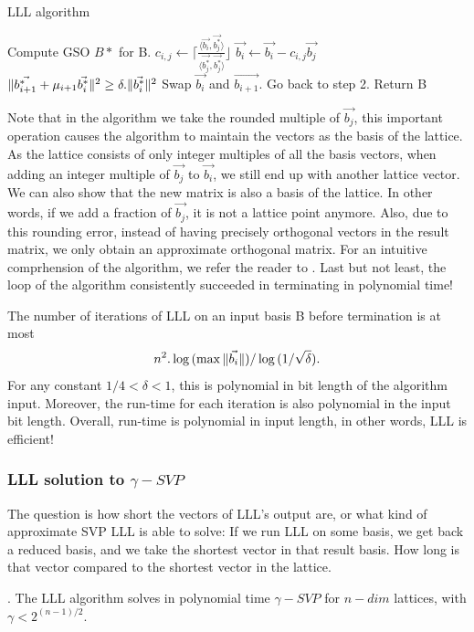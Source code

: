 \begin{algorithm}
  \caption{LLL algorithm}
  \label{alg:LLL}
  \begin{algorithmic}[1]
     \State Compute GSO $B*$ for B.  
     \State
    $c_{i,j} \gets \lceil{\frac{\langle \vec{b_i}, \vec{b_j^*} \rangle}{\langle
        \vec{b_j^*},\vec{b_j^*}\rangle}}\rfloor$ \State
    $\vec{b_i} \gets \vec{b_i} - c_{i,j}\vec{b_j}$ \EndFor \EndFor \If
    {$\Vert \vec{b_{i+1}^*}+\mu_{i+1}\vec{b_i^*} \Vert^2 \geq \delta
      . \Vert \vec{b_i^*} \Vert^2$} \State Swap $\vec{b_i}$ and $\vec{b_{i+1}}$.
    \State Go back to step 2.  \Else \State Return B \EndIf \EndProcedure
  \end{algorithmic}
\end{algorithm}
Note that in the algorithm we take the rounded multiple of $\vec{b_j}$, this
important operation causes the algorithm to maintain the vectors as the basis of
the lattice. As the lattice consists of only integer multiples of all the basis
vectors, when adding an integer multiple of $\vec{b_j}$ to $\vec{b_i}$, we still
end up with another lattice vector. We can also show that the new matrix is also
a basis of the lattice. In other words, if we add a fraction of $\vec{b_j}$, it is
not a lattice point anymore. Also, due to this rounding error, instead of having 
precisely orthogonal vectors in the result matrix, we only obtain an approximate
orthogonal matrix. For an intuitive comprhension of the algorithm, we refer the reader to
\cite{lenstra1982factoring}. Last but not least, the loop of the algorithm consistently succeeded in terminating in polynomial time!
\begin{theorem}
   The number of iterations of LLL on an input basis B before
  termination is at most
  \[
    n^2.\log{(\max{\Vert \vec{b_i} \Vert})} / \log{(1/\sqrt{\delta})}.
  \]
  For any constant $1/4 < \delta < 1$, this is polynomial in bit length of the
  algorithm input. Moreover, the run-time for each iteration is also polynomial
  in the input bit length. Overall, run-time is polynomial in input length, in other words,
  LLL is efficient!
  \label{theo:LLLRunTime}
\end{theorem}

\subsubsection{LLL solution to $\gamma-SVP$}
\label{sec:LLLsolution}
The question is how short the vectors of LLL's output are, or what kind of
approximate SVP LLL is able to solve: If we run LLL on some basis, we get back a
reduced basis, and we take the shortest vector in that result basis. How long is
that vector compared to the shortest vector in the lattice.
\begin{theorem}
  . The LLL algorithm solves in polynomial time
  $\gamma-SVP$ for $n-dim$ lattices, with $\gamma < 2^{(n-1)/2}$.
  \label{theo:LLLShortVector}
\end{theorem}

